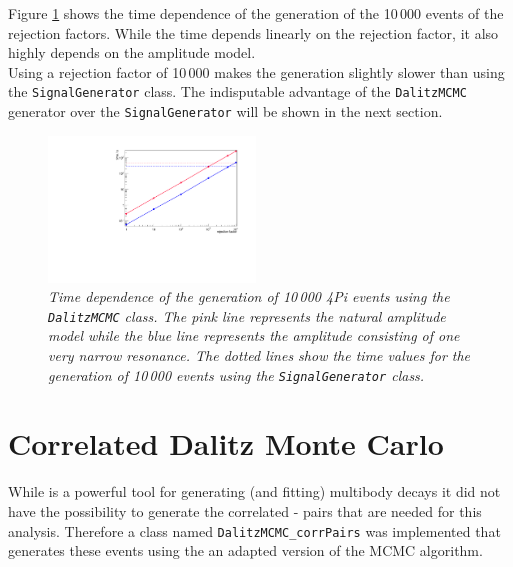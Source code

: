 Figure \ref{fig:time} shows the time dependence of the generation of the 10\,000 events of the rejection factors. While the time depends linearly on the rejection factor, it also highly depends on the amplitude model.\\ 
Using a rejection factor of 10\,000 makes the generation slightly slower than using the \texttt{SignalGenerator} class. The indisputable advantage of the \texttt{DalitzMCMC} generator over the \texttt{SignalGenerator} will be shown in the next section.\\
\begin{figure}[!h]
\vspace*{-0.cm}
  \begin{center}
 \includegraphics[width=0.49\textwidth]{timedep.pdf}
  \vspace*{-0.5cm}
  \end{center}
  \caption{\textit{Time dependence of the generation of 10\,000 \DzTo4Pi events using the \texttt{DalitzMCMC} class. The pink line represents the natural \Dz amplitude model while the blue line represents the amplitude consisting of one very narrow resonance. The dotted lines show the time values for the generation of 10\,000 events using the \texttt{SignalGenerator} class.}}
  \label{fig:time}
\end{figure}



\section{Correlated Dalitz Monte Carlo}
While \mint is a powerful tool for generating (and fitting) multibody \D decays it did not have the possibility to generate the correlated \Dz - \Dzb pairs that are needed for this analysis. Therefore a class named \texttt{DalitzMCMC\_corrPairs} was implemented that generates these events using the an adapted version of the MCMC algorithm.\\

